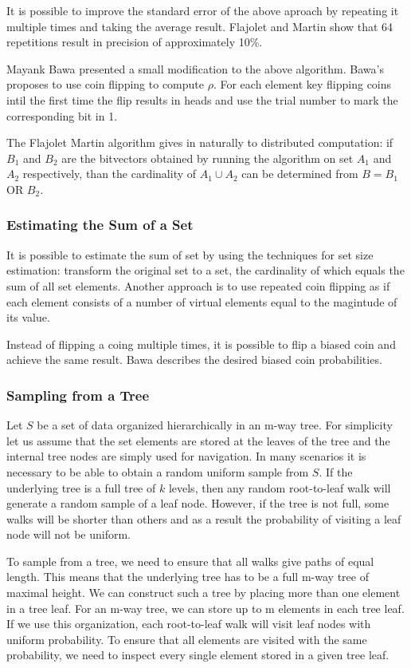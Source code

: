 \documentclass[11pt,twocolumn]{MyTightStyle}
\theoremstyle{plain}
\theoremstyle{definition}
\theoremstyle{remark}
\numberwithin{equation}{section}
\begin{document}
It is possible to improve the standard error of the above aproach by
repeating it multiple times and taking the average result. Flajolet
and Martin show that 64 repetitions result in precision of
approximately 10\%.

Mayank Bawa presented a small modification to the above
algorithm. Bawa's proposes to use coin flipping to compute $\rho$. For
each element key flipping coins intil the first time the flip results
in heads and use the trial number to mark the corresponding bit in 1. 

The Flajolet Martin algorithm gives in naturally to distributed
computation: if $B_1$ and $B_2$ are the bitvectors obtained by running
the algorithm on set $A_1$ and $A_2$ respectively, than the
cardinality of $A_1 \cup A_2$ can be determined from $B = B_1$ OR
$B_2$. 

\subsubsection{Estimating the Sum of a Set}
It is possible to estimate the sum of set by using the techniques for
set size estimation: transform the original set to a set, the
cardinality of which equals the sum of all set elements. Another
approach is to use repeated coin flipping as if each element consists
of a number of virtual elements equal to the magintude of its value.

Instead of flipping a coing multiple times, it is possible to flip a
biased coin and achieve the same result. Bawa describes the desired
biased coin probabilities.


\subsubsection{Sampling from a Tree}
Let $S$ be a set of data organized hierarchically in an m-way
tree. For simplicity let us assume that the set elements are stored at
the leaves of the tree and the internal tree nodes are simply used for
navigation. In many scenarios it is necessary to be able to obtain a
random uniform sample from $S$. If the underlying tree is a full tree
of $k$ levels, then any random root-to-leaf walk will generate a
random sample of a leaf node. However, if the tree is not full, some
walks will be shorter than others and as a result the probability of
visiting a leaf node will not be uniform.

To sample from a tree, we need to ensure that all walks give paths of
equal length. This means that the underlying tree has to be a full
m-way tree of maximal height. We can construct such a tree by placing
more than one element in a tree leaf. For an m-way tree, we can store
up to m elements in each tree leaf. If we use this organization, each
root-to-leaf walk will visit leaf nodes with uniform probability. To
ensure that all elements are visited with the same probability, we
need to inspect every single element stored in a given tree leaf.
\end{document}
